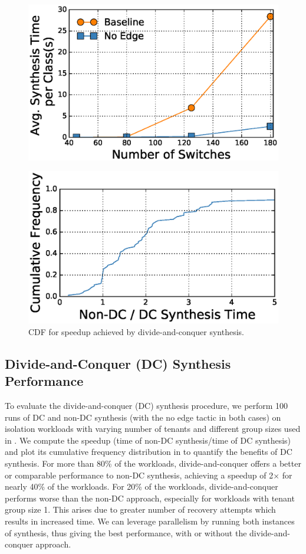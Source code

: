 \begin{figure}[h]
	\centering
	\includegraphics[width=0.65\columnwidth]{figures/linkTopology.eps}
	\label{fig:link-capacity}
\end{figure}

\begin{figure}
	\centering
	\includegraphics[width=0.65\columnwidth]{figures/dcSynthesis.eps}
	\caption{CDF for speedup achieved by divide-and-conquer synthesis.}
	\label{fig:dcsyn-cdf}
\end{figure}
\subsection{Divide-and-Conquer (DC) Synthesis Performance} \label{sec:optimisticeval} 
To evaluate the divide-and-conquer (DC) synthesis procedure, we
perform 100 runs of DC and non-DC synthesis 
(with the no edge tactic in both cases) on isolation
workloads with varying number of tenants and different group sizes
used in . We compute the
speedup (time of non-DC synthesis/time of DC synthesis) and plot its
cumulative frequency distribution in  to quantify
the benefits of DC synthesis. For more than 80\% of the
workloads, divide-and-conquer offers a better or comparable
performance to non-DC synthesis, achieving a speedup of
2$\times$ for nearly 40\% of the workloads. For 20\% of the workloads,
divide-and-conquer performs worse than the non-DC approach,
especially for workloads with tenant group size 1.  This arises due to
greater number of recovery attempts which results in increased time. We can
leverage parallelism by running both instances of synthesis, thus
giving the best performance, with or without the divide-and-conquer
approach.

